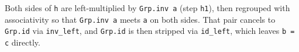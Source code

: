 Both sides of \texttt{h} are left-multiplied by \texttt{Grp.inv a} (step \texttt{h1}), then regrouped with associativity so that \texttt{Grp.inv a} meets \texttt{a} on both sides. That pair cancels to \texttt{Grp.id} via \texttt{inv\_\allowbreak{}left}, and \texttt{Grp.id} is then stripped via \texttt{id\_\allowbreak{}left}, which leaves \texttt{b = c} directly.
